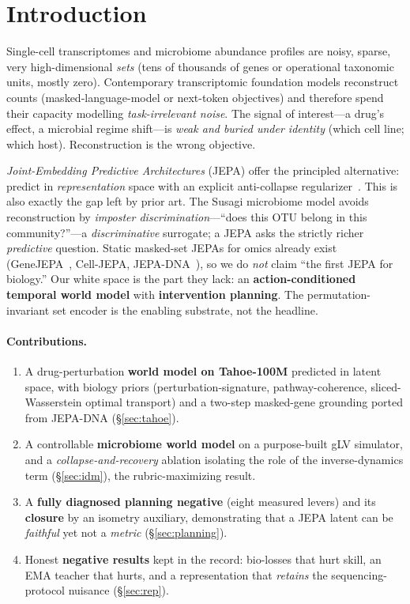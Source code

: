 \documentclass[10pt,twocolumn]{article}
\begin{document}
\section{Introduction}
\label{sec:intro}

Single-cell transcriptomes and microbiome abundance profiles are noisy, sparse, very high-dimensional
\emph{sets} (tens of thousands of genes or operational taxonomic units, mostly zero). Contemporary
transcriptomic foundation models reconstruct counts (masked-language-model or next-token objectives) and
therefore spend their capacity modelling \emph{task-irrelevant noise}. The signal of interest---a drug's
effect, a microbial regime shift---is \emph{weak and buried under identity} (which cell line; which
host). Reconstruction is the wrong objective.

\emph{Joint-Embedding Predictive Architectures} (JEPA) offer the principled alternative: predict in
\emph{representation} space with an explicit anti-collapse regularizer~\cite{ebjepa,lecun2022path}. This
is also exactly the gap left by prior art. The Susagi microbiome model avoids
reconstruction by \emph{imposter discrimination}---``does this OTU belong in this community?''---a
\emph{discriminative} surrogate; a JEPA asks the strictly richer \emph{predictive} question. Static
masked-set JEPAs for omics already exist (GeneJEPA~\cite{genejepa}, Cell-JEPA, JEPA-DNA~\cite{jepadna}),
so we do \emph{not} claim ``the first JEPA for biology.'' Our white space is the part they lack: an
\textbf{action-conditioned temporal world model} with \textbf{intervention planning}. The
permutation-invariant set encoder is the enabling substrate, not the headline.

\paragraph{Contributions.}
\begin{enumerate}[leftmargin=1.3em,itemsep=1pt,topsep=2pt]
\item A drug-perturbation \textbf{world model on Tahoe-100M} predicted in latent space, with biology
  priors (perturbation-signature, pathway-coherence, sliced-Wasserstein optimal transport) and a
  two-step masked-gene grounding ported from JEPA-DNA (\S\ref{sec:tahoe}).
\item A controllable \textbf{microbiome world model} on a purpose-built gLV simulator, and a
  \emph{collapse-and-recovery} ablation isolating the role of the inverse-dynamics term
  (\S\ref{sec:idm}), the rubric-maximizing result.
\item A \textbf{fully diagnosed planning negative} (eight measured levers) and its
  \textbf{closure} by an isometry auxiliary, demonstrating that a JEPA latent can be \emph{faithful} yet
  not a \emph{metric} (\S\ref{sec:planning}).
\item Honest \textbf{negative results} kept in the record: bio-losses that hurt skill, an EMA teacher
  that hurts, and a representation that \emph{retains} the sequencing-protocol nuisance
  (\S\ref{sec:rep}).
\end{enumerate}
\end{document}
